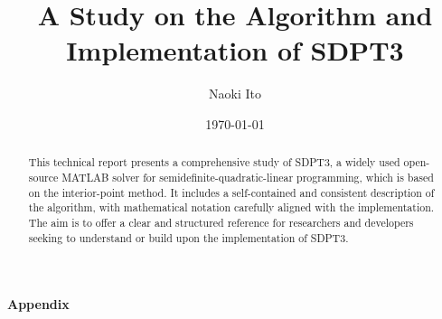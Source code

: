 \documentclass{scrartcl}
\title{A Study on the Algorithm and Implementation of SDPT3}
\author{
    Naoki Ito
}
\date{\today}
\begin{document}
\maketitle
\begin{abstract}
This technical report presents a comprehensive study of SDPT3, a widely used open-source MATLAB solver for semidefinite-quadratic-linear programming, which is based on the interior-point method.
It includes a self-contained and consistent description of the algorithm, with mathematical notation carefully aligned with the implementation.
The aim is to offer a clear and structured reference for researchers and developers seeking to understand or build upon the implementation of SDPT3.
\end{abstract}

\tableofcontents









\clearpage
{}
{}
\begin{center}
{\Large\bfseries\textsf{Appendix}}
\end{center}
\vspace{2em}

\appendix





\end{document}
